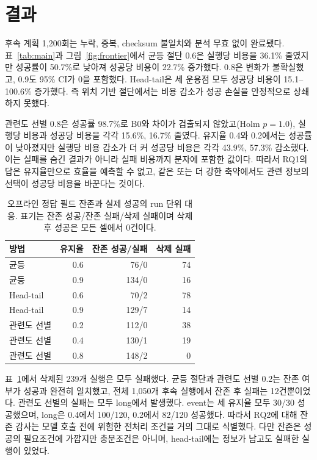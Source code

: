 \documentclass[10pt,twocolumn]{article}
\begin{document}
\section{결과}
후속 계획 1,200회는 누락, 중복, checksum 불일치와 분석 무효 없이 완료됐다.
표~\ref{tab:main}과 그림~\ref{fig:frontier}에서 균등 절단 0.6은 실행당 비용을
36.1\% 줄였지만 성공률이 50.7\%로 낮아져 성공당 비용이 22.7\% 증가했다.
0.8은 변화가 불확실했고, 0.9도 95\% CI가 0을 포함했다. Head-tail은 세
운용점 모두 성공당 비용이 15.1--100.6\% 증가했다. 즉 위치 기반 절단에서는
비용 감소가 성공 손실을 안정적으로 상쇄하지 못했다.

관련도 선별 0.8은 성공률 98.7\%로 B0와 차이가 검출되지 않았고(Holm
$p=1.0$), 실행당 비용과 성공당 비용을 각각 15.6\%, 16.7\% 줄였다. 유지율
0.4와 0.2에서는 성공률이 낮아졌지만 실행당 비용 감소가 더 커 성공당 비용은
각각 43.9\%, 57.3\% 감소했다. 이는 실패를 숨긴 결과가 아니라 실패 비용까지
분자에 포함한 값이다. 따라서 RQ1의 답은 유지율만으로 효율을 예측할 수 없고,
같은 또는 더 강한 축약에서도 관련 정보의 선택이 성공당 비용을 바꾼다는 것이다.

\begin{table}[H]
\centering
\caption{오프라인 정답 필드 잔존과 실제 성공의 run 단위 대응. 표기는
잔존 성공/잔존 실패/삭제 실패이며 삭제 후 성공은 모든 셀에서 0건이다.}
\label{tab:retention}
\small
\begin{tabular}{@{}lrrr@{}}
\toprule
방법 & 유지율 & 잔존 성공/실패 & 삭제 실패 \\
\midrule
균등 & 0.6 & 76/0 & 74 \\
균등 & 0.9 & 134/0 & 16 \\
Head-tail & 0.6 & 70/2 & 78 \\
Head-tail & 0.9 & 129/7 & 14 \\
관련도 선별 & 0.2 & 112/0 & 38 \\
관련도 선별 & 0.4 & 130/1 & 19 \\
관련도 선별 & 0.8 & 148/2 & 0 \\
\bottomrule
\end{tabular}
\end{table}

표~\ref{tab:retention}에서 삭제된 239개 실행은 모두 실패했다. 균등 절단과
관련도 선별 0.2는 잔존 여부가 성공과 완전히 일치했고, 전체 1,050개 후속
실행에서 잔존 후 실패는 12건뿐이었다. 관련도 선별의 실패는 모두 long에서
발생했다. event는 세 유지율 모두 30/30 성공했으며, long은 0.4에서 100/120,
0.2에서 82/120 성공했다. 따라서 RQ2에 대해 잔존 감사는 모델 호출 전에
위험한 전처리 조건을 거의 그대로 식별했다. 다만 잔존은 성공의 필요조건에
가깝지만 충분조건은 아니며, head-tail에는 정보가 남고도 실패한 실행이 있었다.
\end{document}
